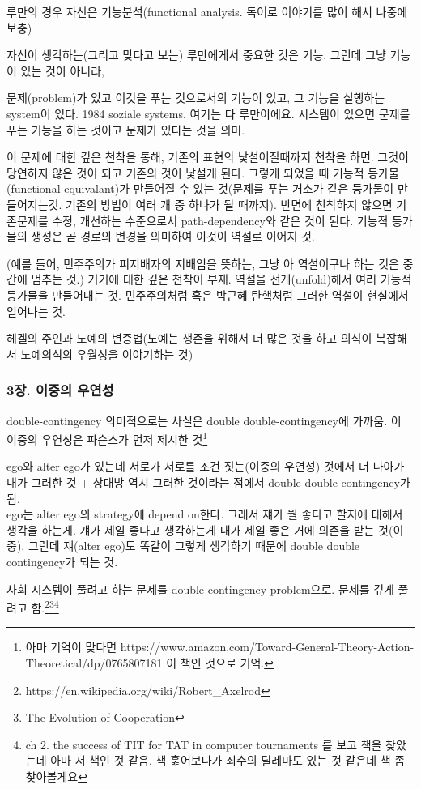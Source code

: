 \documentclass[11pt, a4paper]{article}
\begin{document}
루만의 경우 자신은 기능분석(functional analysis. 독어로 이야기를 많이 해서 나중에 보충)

자신이 생각하는(그리고 맞다고 보는) 루만에게서 중요한 것은 기능. 그런데 그냥 기능이 있는 것이 아니라,

문제(problem)가 있고 이것을 푸는 것으로서의 기능이 있고, 그 기능을 실행하는 system이 있다. 1984 soziale systems. 여기는 다 루만이에요. 시스템이 있으면 문제를 푸는 기능을 하는 것이고 문제가 있다는 것을 의미. 

이 문제에 대한 깊은 천착을 통해, 기존의 표현의 낯설어질때까지 천착을 하면. 그것이 당연하지 않은 것이 되고 기존의 것이 낯설게 된다. 그렇게 되었을 때 기능적 등가물(functional equivalant)가 만들어질 수 있는 것(문제를 푸는 거소가 같은 등가물이 만들어지는것. 기존의 방법이 여러 개 중 하나가 될 때까지). 반면에 천착하지 않으면 기존문제를 수정, 개선하는 수준으로서 path-dependency와 같은 것이 된다. 기능적 등가물의 생성은 곧 경로의 변경을 의미하여 이것이 역설로 이어지 것.

(예를 들어, 민주주의가 피지배자의 지배임을 뜻하는, 그냥 아 역설이구나 하는 것은 중간에 멈추는 것.) 거기에 대한 깊은 천착이 부재. 역설을 전개(unfold)해서 여러 기능적 등가물을 만들어내는 것. 민주주의처럼 혹은 박근혜 탄핵처럼 그러한 역설이 현실에서 일어나는 것. 

헤겔의 주인과 노예의 변증법(노예는 생존을 위해서 더 많은 것을 하고 의식이 복잡해서 노예의식의 우월성을 이야기하는 것)

\subsubsection{3장. 이중의 우연성}
double-contingency
의미적으로는 사실은 double double-contingency에 가까움. 이 이중의 우연성은 파슨스가 먼저 제시한 것\footnote{아마 기억이 맞다면 https://www.amazon.com/Toward-General-Theory-Action-Theoretical/dp/0765807181 이 책인 것으로 기억.}

ego와 alter ego가 있는데 서로가 서로를 조건 짓는(이중의 우연성) 것에서 더 나아가 내가 그러한 것 + 상대방 역시 그러한 것이라는 점에서 double double contingency가 됨. \\

ego는 alter ego의 strategy에 depend on한다. 그래서 쟤가 뭘 좋다고 할지에 대해서 생각을 하는게. 걔가 제일 좋다고 생각하는게 내가 제일 좋은 거에 의존을 받는 것(이중). 그런데 쟤(alter ego)도 똑같이 그렇게 생각하기 때문에 double double contingency가 되는 것.

사회 시스템이 풀려고 하는 문제를 double-contingency problem으로. 문제를 깊게 풀려고 함.\footnote{https://en.wikipedia.org/wiki/Robert_Axelrod}\footnote{The Evolution of Cooperation}\footnote{ch 2. the success of TIT for TAT in computer tournaments 를 보고 책을 찾았는데 아마 저 책인 것 같음. 책 훑어보다가 죄수의 딜레마도 있는 것 같은데 책 좀 찾아볼게요}
\end{document}
